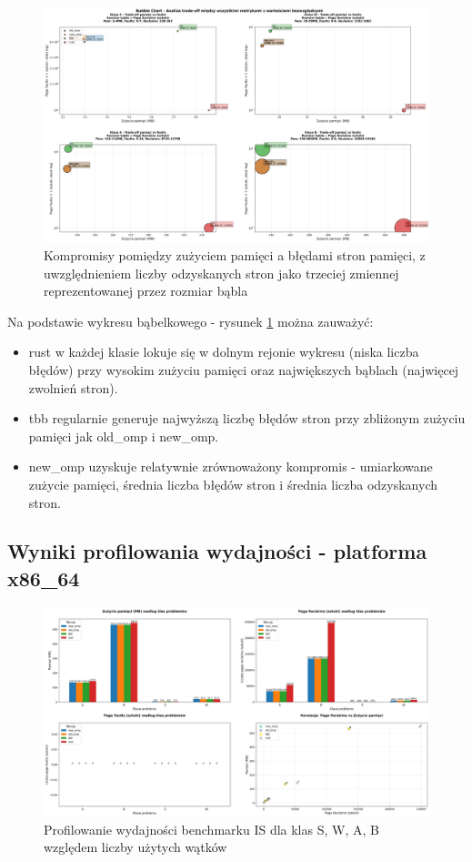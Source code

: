 \begin{figure}[H]
    \centering
    \includegraphics[width=\textwidth]{analiza/images/parallel/is/arm/chart_06_bubble_chart.png}
    \caption{Kompromisy  pomiędzy zużyciem pamięci a błędami stron pamięci, z uwzględnieniem liczby odzyskanych stron jako trzeciej zmiennej reprezentowanej przez rozmiar bąbla}
    \label{is_kompromisy_pamiec_bledy}
\end{figure}
Na podstawie wykresu bąbelkowego - rysunek \ref{is_kompromisy_pamiec_bledy} można zauważyć:
\begin{itemize}
    \item rust w każdej klasie lokuje się w dolnym rejonie wykresu (niska liczba błędów) przy wysokim zużyciu pamięci oraz największych bąblach (najwięcej zwolnień stron).
    \item tbb regularnie generuje najwyższą liczbę błędów stron przy zbliżonym zużyciu pamięci jak old\_omp i new\_omp.
    \item new\_omp uzyskuje relatywnie zrównoważony kompromis - umiarkowane zużycie pamięci, średnia liczba błędów stron i średnia liczba odzyskanych stron.
\end{itemize}
\subsection{Wyniki profilowania wydajności - platforma x86\_64}
\begin{figure}[H]
    \centering
    \includegraphics[width=\textwidth]{analiza/images/parallel/is/x86/chart_01_memory_comparison.png}
    \caption{Profilowanie wydajności benchmarku IS dla klas S, W, A, B względem liczby użytych wątków}
    \label{is_porownanie_zuzycia_pamieci_x86}
\end{figure}

